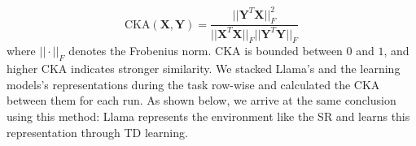 \documentclass{article}
\begin{document}
\begin{equation}\label{eq:cka}
\mathrm{CKA}(\mathbf{X},\mathbf{Y}) = \dfrac{||\mathbf{Y}^T \mathbf{X}||^2_F}{||\mathbf{X}^T\mathbf{X}||_F||\mathbf{Y}^T\mathbf{Y}||_F}
\end{equation}
where $||\cdot||_F$ denotes the Frobenius norm. CKA is bounded between $0$ and $1$, and higher CKA indicates stronger similarity. We stacked Llama's and the learning models's representations during the task row-wise and calculated the CKA between them for each run. As shown below, we arrive at the same conclusion using this method: Llama represents the environment like the SR and learns this representation through TD learning.
\end{document}

